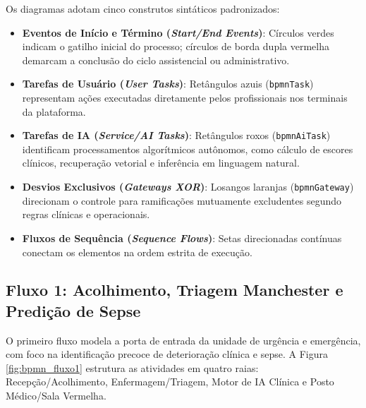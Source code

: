 Os diagramas adotam cinco construtos sintáticos padronizados:
\begin{itemize}[leftmargin=*]
    \item \textbf{Eventos de Início e Término (\textit{Start/End Events})}: Círculos verdes indicam o gatilho inicial do processo; círculos de borda dupla vermelha demarcam a conclusão do ciclo assistencial ou administrativo.
    \item \textbf{Tarefas de Usuário (\textit{User Tasks})}: Retângulos azuis (\texttt{bpmnTask}) representam ações executadas diretamente pelos profissionais nos terminais da plataforma.
    \item \textbf{Tarefas de IA (\textit{Service/AI Tasks})}: Retângulos roxos (\texttt{bpmnAiTask}) identificam processamentos algorítmicos autônomos, como cálculo de escores clínicos, recuperação vetorial e inferência em linguagem natural.
    \item \textbf{Desvios Exclusivos (\textit{Gateways XOR})}: Losangos laranjas (\texttt{bpmnGateway}) direcionam o controle para ramificações mutuamente excludentes segundo regras clínicas e operacionais.
    \item \textbf{Fluxos de Sequência (\textit{Sequence Flows})}: Setas direcionadas contínuas conectam os elementos na ordem estrita de execução.
\end{itemize}


\subsection{Fluxo 1: Acolhimento, Triagem Manchester e Predição de Sepse}
\label{subsec:bpmn_fluxo1}

O primeiro fluxo modela a porta de entrada da unidade de urgência e emergência, com foco na identificação precoce de deterioração clínica e sepse. A Figura \ref{fig:bpmn_fluxo1} estrutura as atividades em quatro raias: Recepção/Acolhimento, Enfermagem/Triagem, Motor de IA Clínica e Posto Médico/Sala Vermelha.

